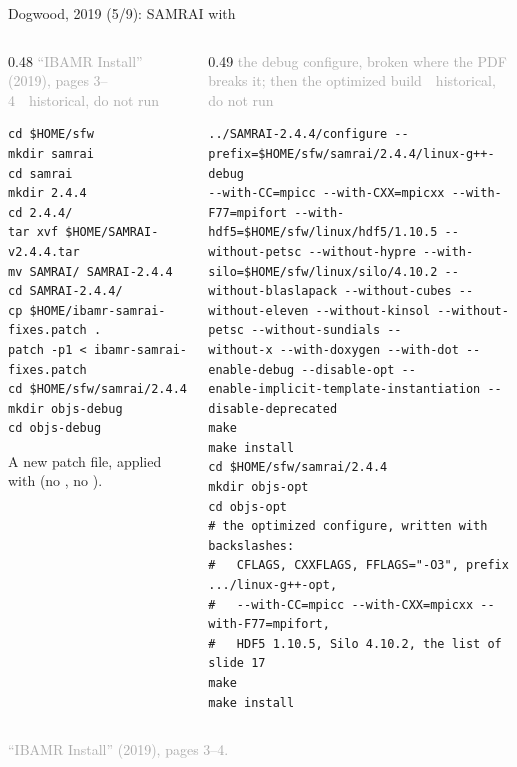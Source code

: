 \documentclass[aspectratio=169,11pt]{beamer}
\newcommand{\sourcecredit}[1]{\vfill\begin{flushright}\tiny\textcolor{DarkGray}{#1}\end{flushright}}
\newcommand{\hist}[1]{{\tiny\sffamily\textcolor{DarkGray}{#1\ \textbullet\ historical, do not run}}\par\nointerlineskip\vspace{0.3mm}}
\begin{document}
\begin{frame}[fragile]{Dogwood, 2019 (5/9): SAMRAI with }
\label{fr:dw5}
\begin{columns}[T,onlytextwidth]
\begin{column}{0.48\textwidth}
\hist{``IBAMR Install'' (2019), pages 3--4}
\begin{lstlisting}[style=hist]
cd $HOME/sfw
mkdir samrai
cd samrai
mkdir 2.4.4
cd 2.4.4/
tar xvf $HOME/SAMRAI-v2.4.4.tar
mv SAMRAI/ SAMRAI-2.4.4
cd SAMRAI-2.4.4/
cp $HOME/ibamr-samrai-fixes.patch .
patch -p1 < ibamr-samrai-fixes.patch
cd $HOME/sfw/samrai/2.4.4
mkdir objs-debug
cd objs-debug
\end{lstlisting}
\footnotesize A new patch file, applied with  (no , no ).
\end{column}
\begin{column}{0.49\textwidth}
\hist{the debug configure, broken where the PDF breaks it; then the optimized build}
\begin{lstlisting}[style=hist]
../SAMRAI-2.4.4/configure --prefix=$HOME/sfw/samrai/2.4.4/linux-g++-debug
--with-CC=mpicc --with-CXX=mpicxx --with-F77=mpifort --with-
hdf5=$HOME/sfw/linux/hdf5/1.10.5 --without-petsc --without-hypre --with-
silo=$HOME/sfw/linux/silo/4.10.2 --without-blaslapack --without-cubes --
without-eleven --without-kinsol --without-petsc --without-sundials --
without-x --with-doxygen --with-dot --enable-debug --disable-opt --
enable-implicit-template-instantiation --disable-deprecated
make
make install
cd $HOME/sfw/samrai/2.4.4
mkdir objs-opt
cd objs-opt
# the optimized configure, written with backslashes:
#   CFLAGS, CXXFLAGS, FFLAGS="-O3", prefix .../linux-g++-opt,
#   --with-CC=mpicc --with-CXX=mpicxx --with-F77=mpifort,
#   HDF5 1.10.5, Silo 4.10.2, the list of slide 17
make
make install
\end{lstlisting}
\end{column}
\end{columns}
\sourcecredit{``IBAMR Install'' (2019), pages 3--4.}
\end{frame}
\end{document}
